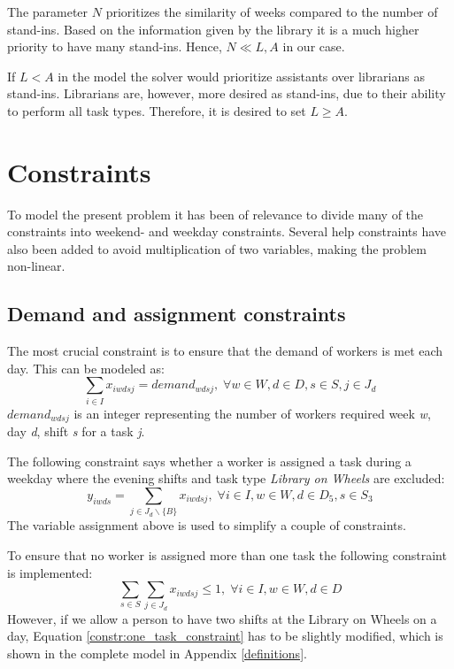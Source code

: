 The parameter $N$ prioritizes the similarity of weeks compared to the number of stand-ins. Based on the information given by the library it is a much higher priority to have many stand-ins. Hence, $N \ll L,A$ in our case.

If $L < A$ in the model the solver would prioritize assistants over librarians as stand-ins. Librarians are, however, more desired as stand-ins, due to their ability to perform all task types. Therefore, it is desired to set $L \geq A$.


\section{Constraints} \label{constraints}
To model the present problem it has been of relevance to divide many of the constraints into weekend- and weekday constraints. Several help constraints have also been added to avoid multiplication of two variables, making the problem non-linear.

\subsection{Demand and assignment constraints} \label{section:demand_ass_constraints}
The most crucial constraint is to ensure that the demand of workers is met each day. This can be modeled as:
\begin{equation}
\sum_{i \in I} x_{iwdsj} = demand_{wdsj}, \; \forall w\in W,d\in D,s\in S,j\in J_d
\end{equation}
$demand_{wdsj}$ is an integer representing the number of workers required week \textit{w}, day \textit{d}, shift \textit{s} for a task \textit{j}.

The following constraint says whether a worker is assigned a task during a weekday where the evening shifts and task type \textit{Library on Wheels} are excluded:
\begin{equation} \label{constr:y_assign}
y_{iwds} = \sum_{j \in J_d\backslash \{B\}} x_{iwdsj}, \; \forall i \in I, w \in W, d \in D_5, s \in S_3
\end{equation}
The variable assignment above is used to simplify a couple of constraints.

To ensure that no worker is assigned more than one task the following constraint is implemented:
\begin{equation} \label{constr:one_task_constraint}
\sum_{s\in S}\sum_{j\in J_d} x_{iwdsj} \leq 1, \; \forall i\in I, w \in W, d\in D
\end{equation}
However, if we allow a person to have two shifts at the Library on Wheels on a day, Equation \ref{constr:one_task_constraint} has to be slightly modified, which is shown in the complete model in Appendix \ref{definitions}.

